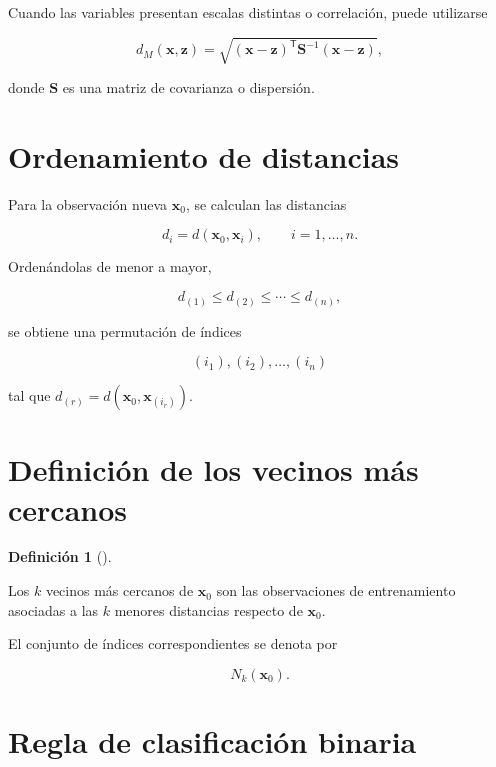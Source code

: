 \documentclass[
  spanish,
  10.5pt,
  letterpaper,
  DIV=11,
  numbers=noendperiod,
  oneside,
  open=any]{scrreprt}
\theoremstyle{definition}
\newtheorem{definition}{Definición}[chapter]
\theoremstyle{definition}
\theoremstyle{plain}
\theoremstyle{remark}
\begin{document}

Cuando las variables presentan escalas distintas o correlación, puede
utilizarse

\[
d_M(\mathbf{x},\mathbf{z})
=
\sqrt{
(\mathbf{x}-\mathbf{z})^{\mathsf T}
\mathbf{S}^{-1}
(\mathbf{x}-\mathbf{z})
},
\]

donde \(\mathbf{S}\) es una matriz de covarianza o dispersión.

\section*{Ordenamiento de distancias}\label{ordenamiento-de-distancias}


Para la observación nueva \(\mathbf{x}_0\), se calculan las distancias

\[
d_i=d(\mathbf{x}_0,\mathbf{x}_i),
\qquad i=1,\ldots,n.
\]

Ordenándolas de menor a mayor,

\[
d_{(1)}\le d_{(2)}\le\cdots\le d_{(n)},
\]

se obtiene una permutación de índices

\[
(i_1),(i_2),\ldots,(i_n)
\]

tal que \(d_{(r)}=d(\mathbf{x}_0,\mathbf{x}_{(i_r)})\).

\section*{Definición de los vecinos más
cercanos}\label{definiciuxf3n-de-los-vecinos-muxe1s-cercanos}


\begin{definition}[]\protect\hypertarget{def-vecinos}{}\label{def-vecinos}

Los \(k\) vecinos más cercanos de \(\mathbf{x}_0\) son las observaciones
de entrenamiento asociadas a las \(k\) menores distancias respecto de
\(\mathbf{x}_0\).

\end{definition}

El conjunto de índices correspondientes se denota por

\[
N_k(\mathbf{x}_0).
\]

\section*{Regla de clasificación
binaria}\label{regla-de-clasificaciuxf3n-binaria}
\end{document}
